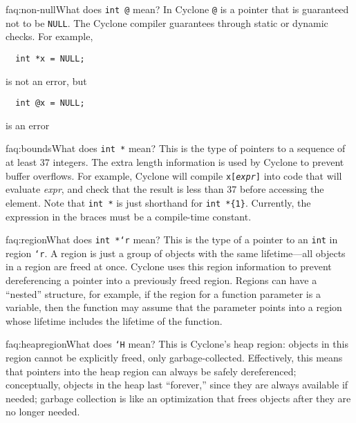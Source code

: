 \begin{faqa}{faq:non-null}{What does \texttt{int @} mean?}
In Cyclone \texttt{@} is a pointer that is guaranteed not to be
\texttt{NULL}.  The Cyclone compiler guarantees through static or
dynamic checks.  For example,
\begin{verbatim}
  int *x = NULL;
\end{verbatim}
is not an error, but
\begin{verbatim}
  int @x = NULL;
\end{verbatim}
is an error
\end{faqa}

\begin{faqa}{faq:bounds}{What does \texttt{int *\rb} mean?}
This is the type of pointers to a sequence of at least 37 integers.
The extra length information is used by Cyclone to prevent buffer
overflows.  For example, Cyclone will compile
\texttt{x[\textup{\textit{expr}}]} into code that will evaluate
\textit{expr}, and check that the result is less than 37 before
accessing the element.  Note that \texttt{int *} is just shorthand for
\verb|int *{1}|.  Currently, the expression in the braces must be a
compile-time constant.
\end{faqa}

\begin{faqa}{faq:region}{What does \texttt{int *`r} mean?}
This is the type of a pointer to an \texttt{int} in region
\texttt{`r}.  A region is just a group of objects with the same
lifetime---all objects in a region are freed at once.  Cyclone uses
this region information to prevent dereferencing a pointer into a
previously freed region.  Regions can have a ``nested'' structure, for
example, if the region for a function parameter is a variable, then
the function may assume that the parameter points into a region whose
lifetime includes the lifetime of the function.
\end{faqa}

\begin{faqa}{faq:heapregion}{What does \texttt{`H} mean?}
  This is Cyclone's heap region: objects in this region cannot be
  explicitly freed, only garbage-collected.  Effectively, this means
  that pointers into the heap region can always be safely
  dereferenced; conceptually, objects in the heap last ``forever,''
  since they are always available if needed; garbage collection is
  like an optimization that frees objects after they are no longer
  needed.  
\end{faqa}

